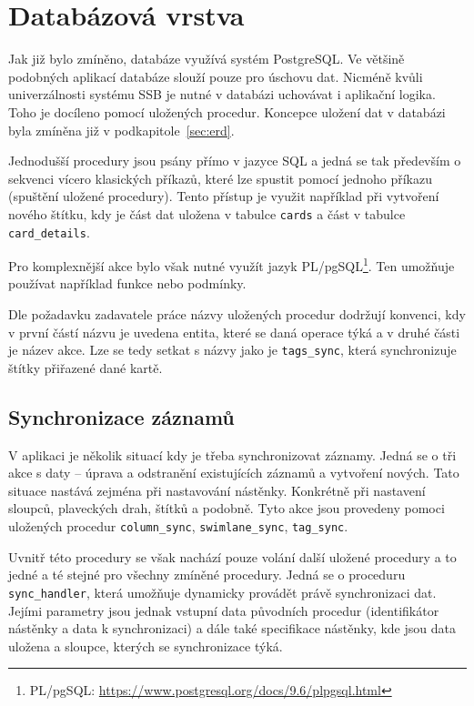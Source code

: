\section{Databázová vrstva}
Jak již bylo zmíněno, databáze využívá systém PostgreSQL. Ve většině podobných aplikací databáze slouží pouze pro úschovu dat. Nicméně kvůli univerzálnosti systému SSB je nutné v databázi uchovávat i aplikační logika. Toho je docíleno pomocí uložených procedur. Koncepce uložení dat v databázi byla zmíněna již v podkapitole~\ref{sec:erd}.

Jednodušší procedury jsou psány přímo v jazyce SQL a jedná se tak především o sekvenci vícero klasických příkazů, které lze spustit pomocí jednoho příkazu (spuštění uložené procedury). Tento přístup je využit například při vytvoření nového štítku, kdy je část dat uložena v tabulce \texttt{cards} a část v tabulce \texttt{card\_details}.

Pro komplexnější akce bylo však nutné využít jazyk PL/pgSQL\footnote{PL/pgSQL: \url{https://www.postgresql.org/docs/9.6/plpgsql.html}}. Ten umožňuje používat například funkce nebo podmínky.

Dle požadavku zadavatele práce názvy uložených procedur dodržují konvenci, kdy v první částí názvu je uvedena entita, které se daná operace týká a v druhé části je název akce. Lze se tedy setkat s názvy jako je \texttt{tags\_sync}, která synchronizuje štítky přiřazené dané kartě. 


\subsection{Synchronizace záznamů}
V aplikaci je několik situací kdy je třeba synchronizovat záznamy. Jedná se o tři akce s daty -- úprava a odstranění existujících záznamů a vytvoření nových. Tato situace nastává zejména při nastavování nástěnky. Konkrétně při nastavení sloupců, plaveckých drah, štítků a podobně. Tyto akce jsou provedeny pomoci uložených procedur \texttt{column\_sync}, \texttt{swimlane\_sync}, \texttt{tag\_sync}.

Uvnitř této procedury se však nachází pouze volání další uložené procedury a to jedné a té stejné pro všechny zmíněné procedury. Jedná se o proceduru \texttt{sync\_handler}, která umožňuje dynamicky provádět právě synchronizaci dat. Jejími parametry jsou jednak vstupní data původních procedur (identifikátor nástěnky a data k synchronizaci) a dále také specifikace nástěnky, kde jsou data uložena a sloupce, kterých se synchronizace týká.

